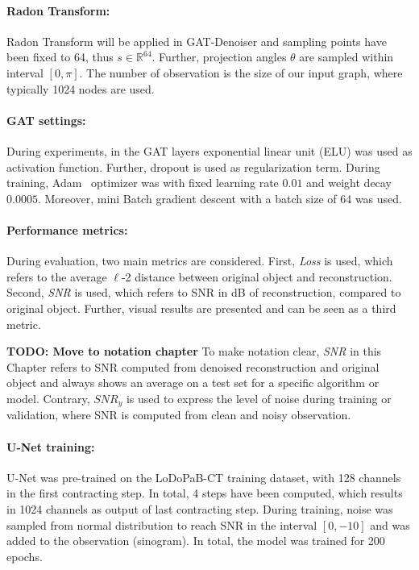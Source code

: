 \paragraph{Radon Transform:}
Radon Transform will be applied in GAT-Denoiser and sampling points have been fixed to 64, thus $s \in \mathbb{R}^64$.
Further, projection angles $\theta$ are sampled within interval $[0, \pi]$.
The number of observation is the size of our input graph, where typically 1024 nodes are used.


\paragraph{GAT settings:}
During experiments, in the GAT layers exponential linear unit (ELU) was used as activation function.
Further, dropout is used as regularization term.
During training, Adam~\cite{adam} optimizer was with fixed learning rate $0.01$ and weight decay $0.0005$.
Moreover, mini Batch gradient descent with a batch size of 64 was used.

\paragraph{Performance metrics:}
During evaluation, two main metrics are considered.
First, \textit{Loss} is used, which refers to the average $\ell$-2 distance between original object and reconstruction.
Second, \textit{SNR} is used, which refers to SNR in dB of reconstruction, compared to original object.
Further, visual results are presented and can be seen as a third metric.


\textbf{TODO: Move to notation chapter}
To make notation clear, \textit{SNR} in this Chapter refers to SNR computed from denoised reconstruction and original object 
and always shows an average on a test set for a specific algorithm or model.
Contrary, $\textit{SNR}_y$ is used to express the level of noise during training or validation, 
where SNR is computed from clean and noisy observation.

\paragraph{U-Net training:}
U-Net was pre-trained on the LoDoPaB-CT training dataset, with 128 channels in the first contracting step. 
In total, 4 steps have been computed, which results in 1024 channels as output of last contracting step.
During training, noise was sampled from normal distribution to reach SNR in the interval $[0, -10]$ and was added to the observation (sinogram). 
In total, the model was trained for 200 epochs.

